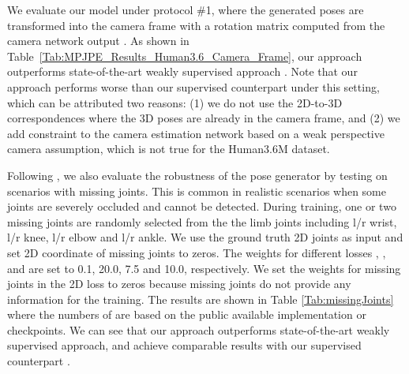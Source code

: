\documentclass{bmvc2k}
\begin{document}
We evaluate our model under protocol \#1, where the generated poses are transformed into the camera frame with a rotation matrix  computed from the camera network output . As shown in Table~\ref{Tab:MPJPE_Results_Human3.6_Camera_Frame}, our approach outperforms state-of-the-art weakly supervised approach \cite{Wandt2019RepNet}.
Note that our approach performs worse than our supervised counterpart \cite{Li_2019_CVPR} under this setting, which can be attributed two reasons: (1) we do not use the 2D-to-3D correspondences where the 3D poses are already in the camera frame, and (2) we add constraint to the camera estimation network based on a weak perspective camera assumption, which is not true for the Human3.6M dataset.

Following \cite{jahangiri2017generating, Li_2019_CVPR}, we also evaluate the robustness of the pose generator by testing on scenarios with missing joints. This is common in realistic scenarios when some joints are severely occluded and cannot be detected. During training, one or two missing joints are randomly selected from the the limb joints including l/r wrist, l/r knee, l/r elbow and l/r ankle. We use the ground truth 2D joints as input and set 2D coordinate of missing joints to zeros. The weights for different losses , ,  and  are set to 0.1, 20.0, 7.5 and 10.0, respectively. We set the weights for missing joints in the 2D loss  to zeros because missing joints do not provide any information for the training. The results are shown in Table \ref{Tab:missingJoints} where the numbers of \cite{Li_2019_CVPR,martinez2017simple, Wandt2019RepNet} are based on the public available implementation or checkpoints. We can see that our approach outperforms state-of-the-art weakly supervised approach\cite{Wandt2019RepNet}, and achieve comparable results with our supervised counterpart \cite{Li_2019_CVPR}.
\end{document}
